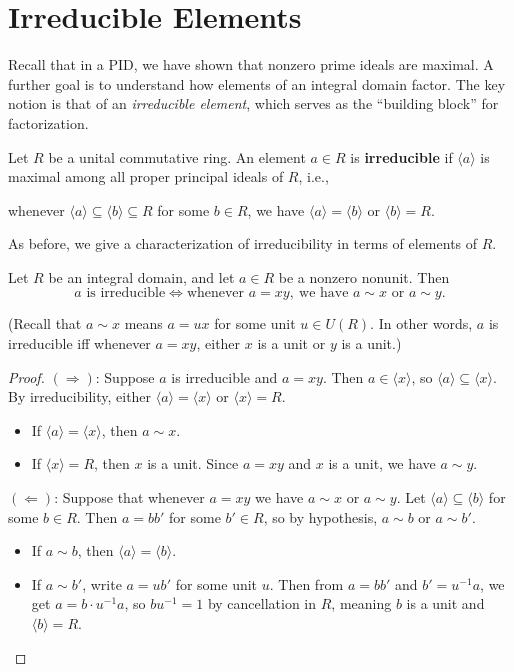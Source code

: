 \section{Irreducible Elements}

Recall that in a PID, we have shown that nonzero prime ideals are maximal. A further goal is to understand how elements of an integral domain factor. The key notion is that of an \emph{irreducible element}, which serves as the ``building block'' for factorization.

\begin{definition}
Let $R$ be a unital commutative ring. An element $a \in R$ is \textbf{irreducible} if $\langle a \rangle$ is maximal among all proper principal ideals of $R$, i.e., 
\begin{center}
whenever $\langle a \rangle \subseteq \langle b \rangle \subseteq R$ for some $b \in R$, we have $\langle a \rangle = \langle b \rangle$ or $\langle b \rangle = R$.
\end{center}
\end{definition}

As before, we give a characterization of irreducibility in terms of elements of $R$.
\begin{lemma}
Let $R$ be an integral domain, and let $a \in R$ be a nonzero nonunit. Then
\[
a \text{ is irreducible} \iff \text{whenever } a = xy,\ \text{we have } a \sim x \text{ or } a \sim y.
\]
\end{lemma}

\noindent (Recall that $a \sim x$ means $a = ux$ for some unit $u \in U(R)$. In other words, $a$ is irreducible iff whenever $a = xy$, either $x$ is a unit or $y$ is a unit.)

\begin{proof}
$(\Rightarrow)$: Suppose $a$ is irreducible and $a = xy$. Then $a \in \langle x \rangle$, so $\langle a \rangle \subseteq \langle x \rangle$. By irreducibility, either $\langle a \rangle = \langle x \rangle$ or $\langle x \rangle = R$.
\begin{itemize}
    \item If $\langle a \rangle = \langle x \rangle$, then $a \sim x$.
    \item If $\langle x \rangle = R$, then $x$ is a unit. Since $a = xy$ and $x$ is a unit, we have $a \sim y$.
\end{itemize}

$(\Leftarrow)$: Suppose that whenever $a = xy$ we have $a \sim x$ or $a \sim y$. Let $\langle a \rangle \subseteq \langle b \rangle$ for some $b \in R$. Then $a = b b'$ for some $b' \in R$, so by hypothesis, $a \sim b$ or $a \sim b'$.
\begin{itemize}
    \item If $a \sim b$, then $\langle a \rangle = \langle b \rangle$.
    \item If $a \sim b'$, write $a = ub'$ for some unit $u$. Then from $a = bb'$ and $b' = u^{-1}a$, we get $a = b \cdot u^{-1} a$, so $b u^{-1} = 1$ by cancellation in $R$, meaning $b$ is a unit and $\langle b \rangle = R$. \qedhere
\end{itemize}
\end{proof}

